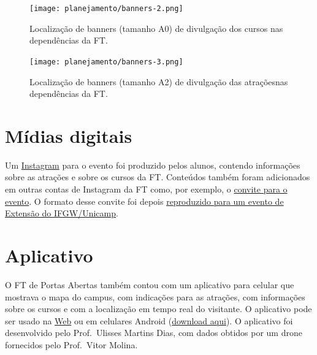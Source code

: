 \documentclass[
  letterpaper,
  DIV=11,
  numbers=noendperiod]{scrreprt}
\begin{document}
\begin{figure}[H]

{\centering \texttt{[image: planejamento/banners-2.png]}

}

\caption{Localização de banners (tamanho A0) de divulgação dos cursos
nas dependências da FT.}

\end{figure}%

\begin{figure}[H]

{\centering \texttt{[image: planejamento/banners-3.png]}

}

\caption{Localização de banners (tamanho A2) de divulgação das
atraçõesnas dependências da FT.}

\end{figure}%

\section{Mídias digitais}\label{muxeddias-digitais}

Um \href{https://www.instagram.com/ftportasabertas/}{Instagram} para o
evento foi produzido pelos alunos, contendo informações sobre as
atrações e sobre os cursos da FT. Conteúdos também foram adicionados em
outras contas de Instagram da FT como, por exemplo, o
\href{https://www.instagram.com/reel/DKZt6T_xspD/}{convite para o
evento}. O formato desse convite foi depois
\href{https://www.instagram.com/p/DKk4qxtSHpM/?hl=pt}{reproduzido para
um evento de Extensão do IFGW/Unicamp}.

\section{Aplicativo}\label{aplicativo}

O FT de Portas Abertas também contou com um aplicativo para celular que
mostrava o mapa do campus, com indicações para as atrações, com
informações sobre os cursos e com a localização em tempo real do
visitante. O aplicativo pode ser usado na
\href{https://diversos-af313.web.app/ftpa/}{Web} ou em celulares Android
(\href{http://wordpress.ft.unicamp.br/ftpa/wp-content/uploads/sites/92/2025/06/ftpa_map.apk}{download
aqui}). O aplicativo foi desenvolvido pelo Prof.~Ulisses Martins Dias,
com dados obtidos por um drone fornecidos pelo Prof.~Vitor Molina.
\end{document}
